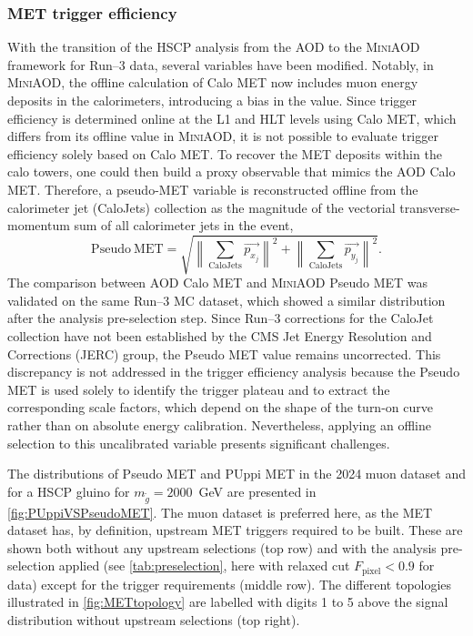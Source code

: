 \subsubsection{MET trigger efficiency}

With the transition of the HSCP analysis from the AOD to the \textsc{MiniAOD} framework for Run--3 data, several variables have been modified. Notably, in \textsc{MiniAOD}, the offline calculation of Calo MET now includes muon energy deposits in the calorimeters, introducing a bias in the value. Since trigger efficiency is determined online at the L1 and HLT levels using Calo MET, which differs from its offline value in \textsc{MiniAOD}, it is not possible to evaluate trigger efficiency solely based on Calo MET. To recover the MET deposits within the calo towers, one could then build a proxy observable that mimics the AOD Calo MET. Therefore, a pseudo-MET variable is reconstructed offline from the calorimeter jet (CaloJets) collection as the magnitude of the vectorial transverse-momentum sum of all calorimeter jets in the event,
\begin{equation}
   \mathrm{Pseudo~MET} = \sqrt{\left\|\sum_{\text{CaloJets}} \overrightarrow{p_{x_j}}\right\|^2 + \left\|\sum_{\text{CaloJets}} \overrightarrow{p_{y_j}} \right\|^2 } .
\end{equation}
The comparison between AOD Calo MET and \textsc{MiniAOD} Pseudo MET was validated on the same Run--3 MC dataset, which showed a similar distribution after the analysis pre-selection step. Since Run--3 corrections for the CaloJet collection have not been established by the CMS Jet Energy Resolution and Corrections (JERC) group, the Pseudo MET value remains uncorrected. This discrepancy is not addressed in the trigger efficiency analysis because the Pseudo MET is used solely to identify the trigger plateau and to extract the corresponding scale factors, which depend on the shape of the turn-on curve rather than on absolute energy calibration. Nevertheless, applying an offline selection to this uncalibrated variable presents significant challenges.

\vspace{0.5 cm}

The distributions of Pseudo MET and PUppi MET in the 2024 muon dataset and for a HSCP gluino for $m_{\tilde{g}}=2000$~GeV are presented in \cref{fig:PUppiVSPseudoMET}. The muon dataset is preferred here, as the MET dataset has, by definition, upstream MET triggers required to be built. These are shown both without any upstream selections (top row) and with the analysis pre-selection applied (see \cref{tab:preselection}, here with relaxed cut $F_\textrm{pixel}<0.9$ for data) except for the trigger requirements (middle row). The different topologies illustrated in \cref{fig:METtopology} are labelled with digits 1 to 5 above the signal distribution without upstream selections (top right).

